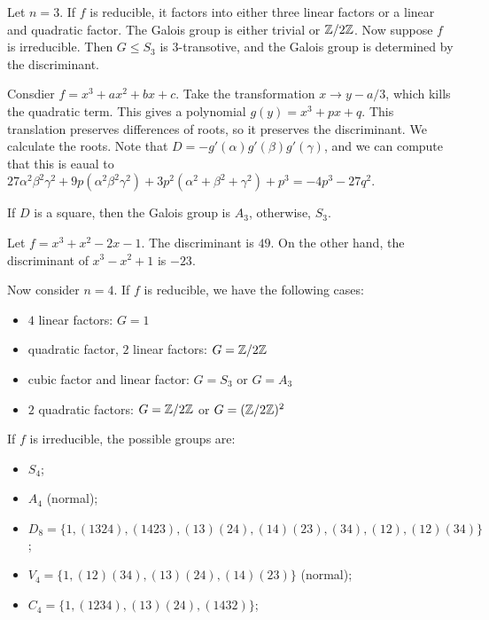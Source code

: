 \message{ !name(notes.tex)}\documentclass[10pt, twoside]{article}
\begin{document}
        Let $n=3$. If $f$ is reducible, it factors into either three linear factors or a linear and quadratic factor. The Galois group is either trivial or $\mathbb{Z}/2\mathbb{Z}$. Now suppose $f$ is irreducible. Then $G \leq S_3$ is $3$-transotive, and the Galois group is determined by the discriminant. 

        Consdier $f = x^3 + ax^2 + bx + c$. Take the transformation $x \to y-a/3$, which kills the quadratic term. This gives a polynomial $g(y) = x^3 + px + q$. This translation preserves differences of roots, so it preserves the discriminant. We calculate the roots. Note that $D = -g'(\alpha)g'(\beta)g'(\gamma)$, and we can compute that this is eaual to $27 \alpha^2 \beta^2 \gamma^2 + 9p(\alpha^2 \beta^2 \gamma^2) + 3p^2 (\alpha^2 + \beta^2 + \gamma^2) + p^3 = -4p^3 - 27q^2$.

        If $D$ is a square, then the Galois group is $A_3$, otherwise, $S_3$.

        \begin{exm}
            Let $f = x^3+x^2-2x-1$. The discriminant is $49$. On the other hand, the discriminant of $x^3-x^2 + 1$ is $-23$.
        \end{exm}

        Now consider $n = 4$. If $f$ is reducible, we have the following cases:
        \begin{itemize}
            \item $4$ linear factors: $G = 1$
            \item quadratic factor, $2$ linear factors: $G = \mathbb{Z}/2\mathbb{Z}$
            \item cubic factor and linear factor: $G = S_3$ or $G = A_3$
            \item $2$ quadratic factors: $G = \mathbb{Z}/2\mathbb{Z}$ or $G = (\mathbb{Z}/2\mathbb{Z})^2$
        \end{itemize}

        If $f$ is irreducible, the possible groups are:
        \begin{itemize}
            \item $S_4$;
            \item $A_4$ (normal);
            \item $D_8 = \{1, (1324), (1423), (13)(24), (14)(23), (34), (12), (12)(34) \}$;
            \item $V_4 = \{ 1, (12)(34), (13)(24), (14)(23) \}$ (normal);
            \item $C_4 = \{1, (1234), (13)(24), (1432)\}$;
        \end{itemize}
\end{document}

